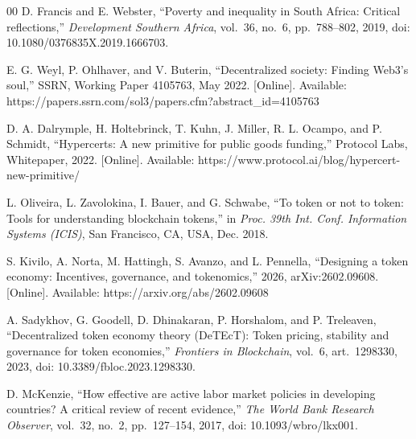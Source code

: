 \documentclass[conference]{IEEEtran}
\begin{document}
\begin{thebibliography}{00}
	 D. Francis and E. Webster, ``Poverty and inequality in South Africa: Critical reflections,'' \emph{Development Southern Africa}, vol.~36, no.~6, pp.~788--802, 2019, doi: 10.1080/0376835X.2019.1666703.

	 E. G. Weyl, P. Ohlhaver, and V. Buterin, ``Decentralized society: Finding Web3's soul,'' SSRN, Working Paper 4105763, May 2022. [Online]. Available: https://papers.ssrn.com/sol3/papers.cfm?abstract\_id=4105763

	 D. A. Dalrymple, H. Holtebrinck, T. Kuhn, J. Miller, R. L. Ocampo, and P. Schmidt, ``Hypercerts: A new primitive for public goods funding,'' Protocol Labs, Whitepaper, 2022. [Online]. Available: https://www.protocol.ai/blog/hypercert-new-primitive/

	 L. Oliveira, L. Zavolokina, I. Bauer, and G. Schwabe, ``To token or not to token: Tools for understanding blockchain tokens,'' in \emph{Proc. 39th Int. Conf. Information Systems (ICIS)}, San Francisco, CA, USA, Dec. 2018.

	 S. Kivilo, A. Norta, M. Hattingh, S. Avanzo, and L. Pennella, ``Designing a token economy: Incentives, governance, and tokenomics,'' 2026, arXiv:2602.09608. [Online]. Available: https://arxiv.org/abs/2602.09608

	 A. Sadykhov, G. Goodell, D. Dhinakaran, P. Horshalom, and P. Treleaven, ``Decentralized token economy theory (DeTEcT): Token pricing, stability and governance for token economies,'' \emph{Frontiers in Blockchain}, vol.~6, art.~1298330, 2023, doi: 10.3389/fbloc.2023.1298330.

	 D. McKenzie, ``How effective are active labor market policies in developing countries? A critical review of recent evidence,'' \emph{The World Bank Research Observer}, vol.~32, no.~2, pp.~127--154, 2017, doi: 10.1093/wbro/lkx001.

\end{thebibliography}
\vspace{12pt}
\end{document}

